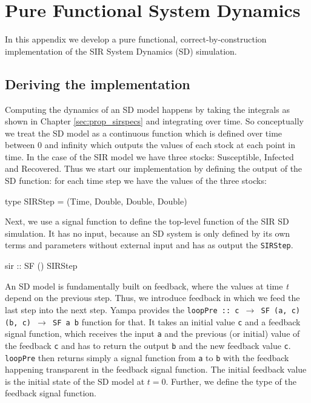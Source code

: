 \chapter{Pure Functional System Dynamics}
\label{app:sd_simulation}
In this appendix we develop a pure functional, correct-by-construction implementation of the SIR System Dynamics (SD) simulation. %

\section{Deriving the implementation}
Computing the dynamics of an SD model happens by taking the integrals as shown in Chapter \ref{sec:prop_sirspecs} and integrating over time. So conceptually we treat the SD model as a continuous function which is defined over time between 0 and infinity which outputs the values of each stock at each point in time. In the case of the SIR model we have three stocks: Susceptible, Infected and Recovered. Thus we start our implementation by defining the output of the SD function: for each time step we have the values of the three stocks:

\begin{HaskellCode}
type SIRStep = (Time, Double, Double, Double)
\end{HaskellCode}

Next, we use a signal function to define the top-level function of the SIR SD simulation. It has no input, because an SD system is only defined by its own terms and parameters without external input and has as output the \texttt{SIRStep}.

\begin{HaskellCode}
sir :: SF () SIRStep
\end{HaskellCode}

An SD model is fundamentally built on feedback, where the values at time \textit{t} depend on the previous step. Thus, we introduce feedback in which we feed the last step into the next step. Yampa provides the \texttt{loopPre :: c $\to$ SF (a, c) (b, c) $\to$ SF a b} function for that. It takes an initial value \texttt{c} and a feedback signal function, which receives the input \texttt{a} and the previous (or initial) value of the feedback \texttt{c} and has to return the output \texttt{b} and the new feedback value \texttt{c}. \texttt{loopPre} then returns simply a signal function from \texttt{a} to \texttt{b} with the feedback happening transparent in the feedback signal function. The initial feedback value is the initial state of the SD model at $t = 0$. Further, we define the type of the feedback signal function.

